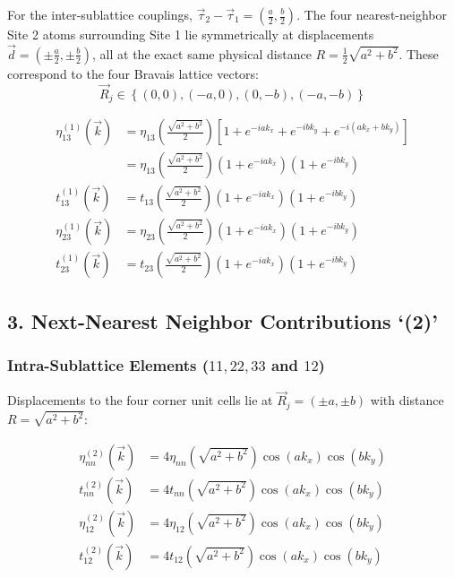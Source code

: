 \documentclass[11pt]{article}
\begin{document}
For the inter-sublattice couplings, $\vec{\tau}_{2} - \vec{\tau}_{1} = \left( \frac{a}{2}, \frac{b}{2} \right)$. The four nearest-neighbor Site 2 atoms surrounding Site 1 lie symmetrically at displacements $\vec{d} = \left(\pm \frac{a}{2}, \pm \frac{b}{2}\right)$, all at the exact same physical distance $R = \frac{1}{2}\sqrt{a^{2} + b^{2}}$. These correspond to the four Bravais lattice vectors:
\[
\vec{R}_{j} \in \left\{ (0,0), (-a,0), (0,-b), (-a,-b) \right\}
\]

\begin{align*}
\eta_{13}^{(1)}(\vec{k}) &= \eta_{13}\left(\frac{\sqrt{a^{2} + b^{2}}}{2} \right) \left[ 1 + e^{- i a k_{x}} + e^{- i b k_{y}} + e^{- i (a k_{x} + b k_{y})} \right] \\
&= \eta_{13}\left(\frac{\sqrt{a^{2} + b^{2}}}{2} \right) \left(1 + e^{- i a k_{x}}\right)\left(1 + e^{- i b k_{y}}\right) \\[1em]
t_{13}^{(1)}(\vec{k}) &= t_{13}\left(\frac{\sqrt{a^{2} + b^{2}}}{2} \right) \left(1 + e^{- i a k_{x}}\right)\left(1 + e^{- i b k_{y}}\right) \\[1em]
\eta_{23}^{(1)}(\vec{k}) &= \eta_{23}\left(\frac{\sqrt{a^{2} + b^{2}}}{2} \right) \left(1 + e^{- i a k_{x}}\right)\left(1 + e^{- i b k_{y}}\right) \\[1em]
t_{23}^{(1)}(\vec{k}) &= t_{23}\left(\frac{\sqrt{a^{2} + b^{2}}}{2} \right) \left(1 + e^{- i a k_{x}}\right)\left(1 + e^{- i b k_{y}}\right)
\end{align*}

\subsection*{3. Next-Nearest Neighbor Contributions `(2)'}

\subsubsection*{Intra-Sublattice Elements ($11, 22, 33$ and $12$)}

Displacements to the four corner unit cells lie at $\vec{R}_j = (\pm a, \pm b)$ with distance $R = \sqrt{a^2 + b^2}$:

\begin{align*}
\eta_{nn}^{(2)}(\vec{k}) &= 4 \eta_{nn}\left(\sqrt{a^{2} + b^{2}} \right) \cos{\left(a k_{x} \right)} \cos{\left(b k_{y} \right)} \\
t_{nn}^{(2)}(\vec{k}) &= 4 t_{nn}\left(\sqrt{a^{2} + b^{2}} \right) \cos{\left(a k_{x} \right)} \cos{\left(b k_{y} \right)} \\[1em]
\eta_{12}^{(2)}(\vec{k}) &= 4 \eta_{12}\left(\sqrt{a^{2} + b^{2}} \right) \cos{\left(a k_{x} \right)} \cos{\left(b k_{y} \right)} \\
t_{12}^{(2)}(\vec{k}) &= 4 t_{12}\left(\sqrt{a^{2} + b^{2}} \right) \cos{\left(a k_{x} \right)} \cos{\left(b k_{y} \right)}
\end{align*}
\end{document}
